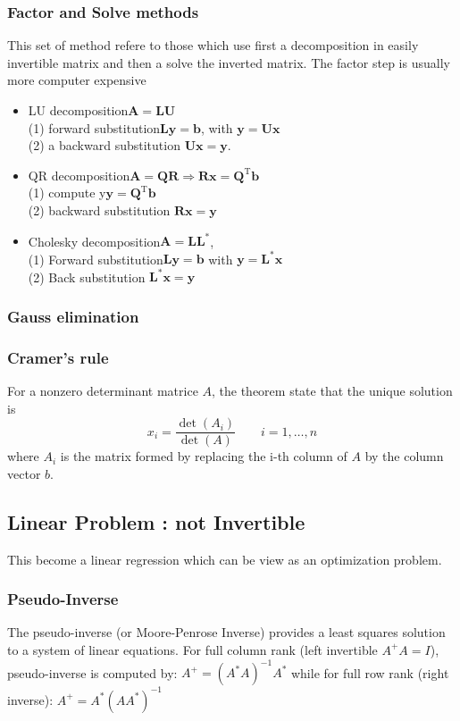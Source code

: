 \documentclass[twocolumn]{article}
\numberwithin{equation}{section}
\begin{document}
		\subsubsection{Factor and Solve methods}
This set of method refere to those which use first a decomposition in easily invertible matrix and then a solve the inverted matrix. The factor step is usually more computer expensive
	\begin{itemize}
		\item LU decomposition\hfill $\mathbf{A=LU}$ \\
		(1) forward substitution\hfill $\mathbf{Ly=b}$, with $\mathbf{y=Ux}$\\
		(2) a backward substitution \hfill$\mathbf{Ux=y}$.
		\item QR decomposition\hfill $\mathbf{A=QR \Rightarrow Rx=Q^\mathrm{T}b}$\\ 
		(1) compute y\hfill $\mathbf{y=Q^\mathrm{T}b}$\\
		(2) backward substitution \hfill$\mathbf{Rx=y}$
		\item Cholesky decomposition\hfill $\mathbf{A = LL^*}$,\\
		(1) Forward substitution\hfill $\mathbf{Ly = b}$ with $\mathbf{y=L^*x}$\\
		(2) Back substitution \hfill$\mathbf{L^*x = y}$
	\end{itemize}
	
		\subsubsection{Gauss elimination}
		\subsubsection{Cramer's rule}
For a nonzero determinant matrice $A$, the theorem state that the unique solution is
	$$ x_i = \frac{\det(A_i)}{\det(A)} \qquad i = 1, \ldots, n$$
where  $A_i$  is the matrix formed by replacing the i-th column of $A$ by the column vector $b$.


	\subsection{Linear Problem : not Invertible}
This become a linear regression which can be view as an optimization problem.

		\subsubsection{Pseudo-Inverse}
The pseudo-inverse (or Moore-Penrose Inverse) provides a least squares solution to a system of linear equations.
For full column rank (left invertible $ A^+A=I$), pseudo-inverse is computed by: $ A^+ = (A^* A)^{-1} A^*$ while for full row rank (right inverse): $ A^+ = A^* (A A^*)^{-1} $
		
\end{document}
